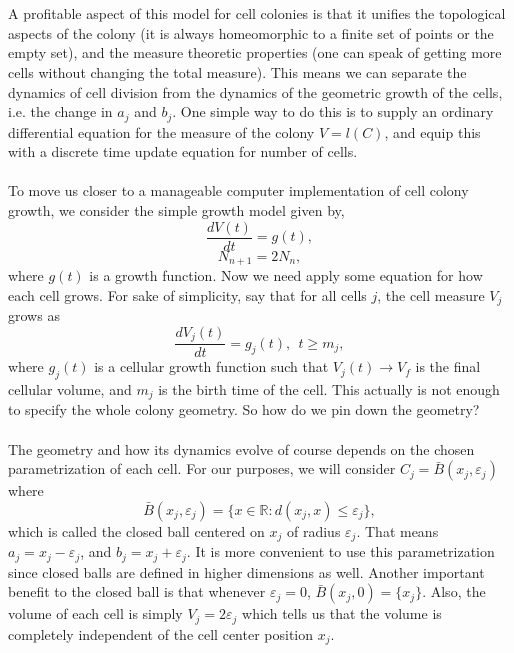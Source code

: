 \\
\\
A profitable aspect of this model for cell colonies is that it unifies the topological aspects of the colony (it is always homeomorphic to a finite set of points or the empty set), and the measure theoretic properties (one can speak of getting more cells without changing the total measure). This means we can separate the dynamics of cell division from the dynamics of the geometric growth of the cells, i.e. the change in $a_j$ and $b_j$. One simple way to do this is to supply an ordinary differential equation for the measure of the colony $V = l(C)$, and equip this with a discrete time update equation for number of cells. 
\\
\\
To move us closer to a manageable computer implementation of cell colony growth, we consider the simple growth model given by,
\begin{equation*}
    \frac{dV(t)}{dt} = g(t),
\end{equation*}
\begin{equation*}
    N_{n+1} = 2N_n,
\end{equation*}
where $g(t)$ is a growth function. Now we need apply some equation for how each cell grows. For sake of simplicity, say that for all cells $j$, the cell measure $V_j$ grows as
\begin{equation*}
    \frac{dV_j(t)}{dt} = g_j(t), \ \ t \geq m_j,
\end{equation*}
 where $g_j(t)$ is a cellular growth function such that $V_j(t) \rightarrow V_f$ is the final cellular volume, and $m_j$ is the birth time of the cell. This actually is not enough to specify the whole colony geometry. So how do we pin down the geometry?
\\
\\
The geometry and how its dynamics evolve of course depends on the chosen parametrization of each cell. For our purposes, we will consider $C_j = \bar{B} (x_j, \varepsilon_j)$ where
\begin{equation*}
    \bar{B} (x_j, \varepsilon_j) = \{ x \in \mathbb{R} : d(x_j,x) \leq \varepsilon_j \},
\end{equation*} 
which is called the closed ball centered on $x_j$ of radius $\varepsilon_j$. That means $a_j = x_j-\varepsilon_j$, and $b_j = x_j+\varepsilon_j$. It is more convenient to use this parametrization since closed balls are defined in higher dimensions as well. Another important benefit to the closed ball is that whenever $\varepsilon_j = 0$, $\bar{B} (x_j, 0) = \{ x_j\}$. Also, the volume of each cell is simply $V_j = 2\varepsilon_j$ which tells us that the volume is completely independent of the cell center position $x_j$.
